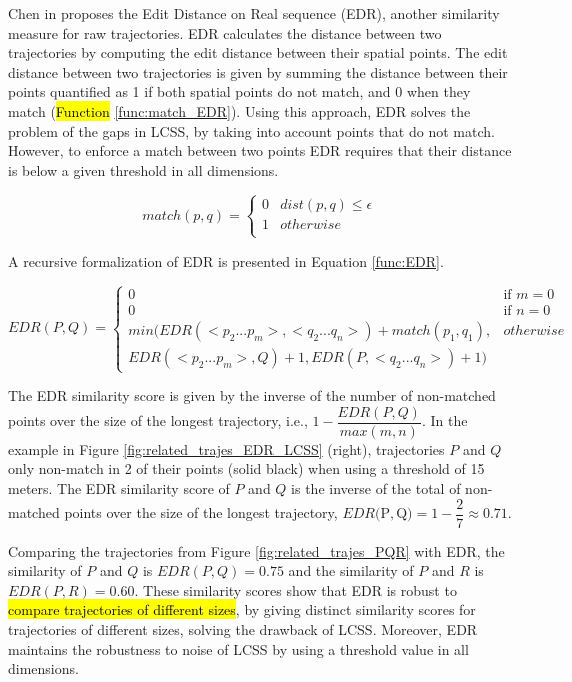 \documentclass[12pt]{article}
\begin{document}
Chen in \cite{Chen:2005:RFS:1066157.1066213} proposes the Edit Distance on Real sequence (EDR), another similarity measure for raw trajectories. EDR calculates the distance between two trajectories by computing the edit distance between their spatial points. The edit distance between two trajectories is given by summing the distance between their points quantified as 1 if both spatial points do not match, and 0 when they match (\hl{Function} \ref{func:match_EDR}). Using this approach, EDR solves the problem of the gaps in LCSS, by taking into account points that do not match. However, to enforce a match between two points EDR requires that their distance is below a given threshold in all dimensions.

\begin{equation}
\label{func:match_EDR}
  match(p, q) = 
  \begin{cases} 
      0 & dist(p, q) \leq \epsilon \\ 
      1 & otherwise\\
  \end{cases}
\end{equation}

A recursive  formalization of EDR is presented in Equation \ref{func:EDR}.

\begin{equation}
\label{func:EDR}
  EDR(P, Q) = 
  \begin{cases} 
      0 & \text{if } m = 0\\ 
      0 & \text{if } n = 0\\ 
      min(EDR(<p_2...p_m>,<q_2...q_n>) + match(p_1, q_1), & otherwise\\
      EDR(<p_2...p_m>, Q) + 1, EDR(P, <q_2...q_n>) + 1) &
  \end{cases}
\end{equation}

The EDR similarity score is given by the inverse of the number of non-matched points over the size of the longest trajectory, i.e., $1 - \dfrac{EDR(P, Q)}{max(m, n)}$. In the example in Figure \ref{fig:related_trajes_EDR_LCSS} (right), trajectories $P$ and $Q$ only non-match in 2 of their points (solid black) when using a threshold of 15 meters. The EDR similarity score of $P$ and $Q$ is the inverse of the total of non-matched points over the size of the longest trajectory, $EDR($P$, $Q$) = 1 - \dfrac{2}{7} \approx 0.71$.

Comparing the trajectories from Figure \ref{fig:related_trajes_PQR} with EDR, the similarity of $P$ and $Q$ is $EDR(P, Q) = 0.75$ and the similarity of $P$ and $R$ is $EDR(P, R) = 0.60$. These similarity scores show that EDR is robust to \hl{compare trajectories of different sizes}, by giving distinct similarity scores for trajectories of different sizes, solving the drawback of LCSS. Moreover, EDR maintains the robustness to noise of LCSS by using a threshold value in all dimensions.
\end{document}
